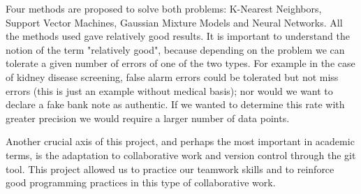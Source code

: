 \documentclass[11pt,a4paper]{article}
\begin{document}
Four methods are proposed to solve both problems: K-Nearest Neighbors, Support Vector Machines, Gaussian Mixture Models and Neural Networks. All the methods used gave relatively good results. It is important to understand the notion of the term "relatively good", because depending on the problem we can tolerate a given number of errors of one of the two types. For example in the case of kidney disease screening, false alarm errors could be tolerated but not miss errors (this is just an example without medical basis); nor would we want to declare a fake bank note as authentic. If we wanted to determine this rate with greater precision we would require a larger number of data points.

Another crucial axis of this project, and perhaps the most important in academic terms, is the adaptation to collaborative work and version control through the git tool. This project allowed us to practice our teamwork skills and to reinforce good programming practices in this type of collaborative work.
\end{document}
